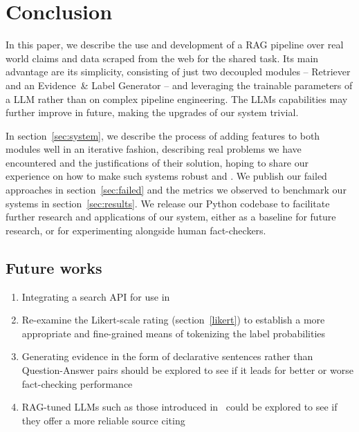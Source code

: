 
\section{Conclusion}
\label{sec:conclusion}
In this paper, we describe the use and development of a RAG pipeline over real world claims and data scraped from the web for the \averitec{} shared task.
Its main advantage are its simplicity, consisting of just two decoupled modules -- Retriever and an Evidence~\& Label Generator -- and leveraging the trainable parameters of a LLM rather than on complex pipeline engineering.
The LLMs capabilities may further improve in future, making the upgrades of our system trivial.

In section~\ref{sec:system}, we describe the process of adding features to both modules well in an iterative fashion, describing real problems we have encountered and the justifications of their solution, hoping to share our experience on how to make such systems robust and .
We publish our failed approaches in section~\ref{sec:failed} and the metrics we observed to benchmark our systems in section~\ref{sec:results}. 
We release our Python codebase to facilitate further research and applications of our system, either as a baseline for future research, or for experimenting alongside human fact-checkers.

\subsection{Future works}
\begin{enumerate}
    \item Integrating a search API for use in  
    \item Re-examine the Likert-scale rating (section~\ref{likert}) to establish a more appropriate and fine-grained means of tokenizing the label probabilities
    \item Generating evidence in the form of declarative sentences rather than Question-Answer pairs should be explored to see if it leads for better or worse fact-checking performance
    \item RAG-tuned LLMs such as those introduced in~\cite{menick2022teachinglanguagemodelssupport} could be explored to see if they offer a more reliable source citing
\end{enumerate}